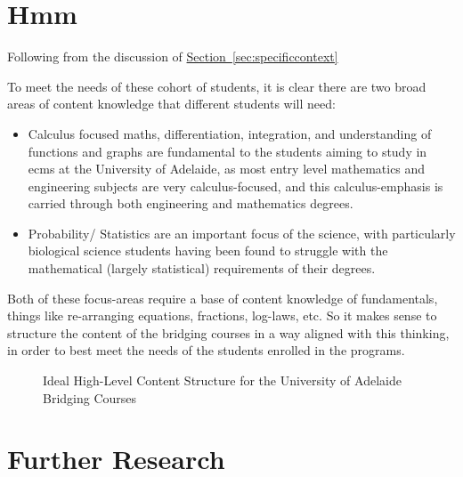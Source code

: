 \documentclass[twoside,12pt,a4paper]{report}
\newcommand{\refsec}[1]{\hyperref[sec:#1]{Section~\ref{sec:#1}}}
\begin{document}
\section{Hmm}

Following from the discussion of \refsec{specificcontext}

To meet the needs of these cohort of students, it is clear there are two broad areas of content knowledge that different students will need:
\begin{itemize}
	\item Calculus focused maths, differentiation, integration, and understanding of functions and graphs are fundamental to the students aiming to study in \gls{ecms} at the University of Adelaide, as most entry level mathematics and engineering subjects are very calculus-focused, and this calculus-emphasis is carried through both engineering and mathematics degrees. 
	\item Probability/ Statistics are an important focus of the science, with particularly biological science students having been found to struggle with the mathematical (largely statistical) requirements of their degrees. 
\end{itemize}
Both of these focus-areas require a base of content knowledge of fundamentals, things like re-arranging equations, fractions, log-laws, etc. So it makes sense to structure the content of the bridging courses in a way aligned with this thinking, in order to best meet the needs of the students enrolled in the programs.

\begin{figure}
\begin{center}
\end{center}
\caption{Ideal High-Level Content Structure for the University of Adelaide Bridging Courses \label{fig:contentStructure}}
\end{figure}






\section{Further Research}
\end{document}
